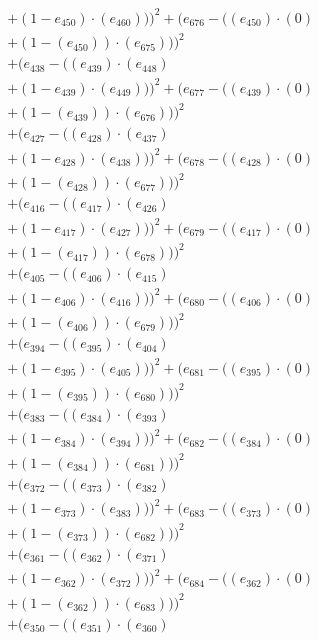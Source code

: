 \documentclass[10pt, a4paper]{article}
\begin{document}
\begin{small}
\begin{align*}
& + (1 - e_{450})  \cdot  (e_{460})))^{2} + (e_{676} - ((e_{450}) \cdot (0) \\
& + (1 - (e_{450})) \cdot (e_{675})))^{2} \\
& + (e_{438} - ((e_{439})  \cdot  (e_{448}) \\
& + (1 - e_{439})  \cdot  (e_{449})))^{2} + (e_{677} - ((e_{439}) \cdot (0) \\
& + (1 - (e_{439})) \cdot (e_{676})))^{2} \\
& + (e_{427} - ((e_{428})  \cdot  (e_{437}) \\
& + (1 - e_{428})  \cdot  (e_{438})))^{2} + (e_{678} - ((e_{428}) \cdot (0) \\
& + (1 - (e_{428})) \cdot (e_{677})))^{2} \\
& + (e_{416} - ((e_{417})  \cdot  (e_{426}) \\
& + (1 - e_{417})  \cdot  (e_{427})))^{2} + (e_{679} - ((e_{417}) \cdot (0) \\
& + (1 - (e_{417})) \cdot (e_{678})))^{2} \\
& + (e_{405} - ((e_{406})  \cdot  (e_{415}) \\
& + (1 - e_{406})  \cdot  (e_{416})))^{2} + (e_{680} - ((e_{406}) \cdot (0) \\
& + (1 - (e_{406})) \cdot (e_{679})))^{2} \\
& + (e_{394} - ((e_{395})  \cdot  (e_{404}) \\
& + (1 - e_{395})  \cdot  (e_{405})))^{2} + (e_{681} - ((e_{395}) \cdot (0) \\
& + (1 - (e_{395})) \cdot (e_{680})))^{2} \\
& + (e_{383} - ((e_{384})  \cdot  (e_{393}) \\
& + (1 - e_{384})  \cdot  (e_{394})))^{2} + (e_{682} - ((e_{384}) \cdot (0) \\
& + (1 - (e_{384})) \cdot (e_{681})))^{2} \\
& + (e_{372} - ((e_{373})  \cdot  (e_{382}) \\
& + (1 - e_{373})  \cdot  (e_{383})))^{2} + (e_{683} - ((e_{373}) \cdot (0) \\
& + (1 - (e_{373})) \cdot (e_{682})))^{2} \\
& + (e_{361} - ((e_{362})  \cdot  (e_{371}) \\
& + (1 - e_{362})  \cdot  (e_{372})))^{2} + (e_{684} - ((e_{362}) \cdot (0) \\
& + (1 - (e_{362})) \cdot (e_{683})))^{2} \\
& + (e_{350} - ((e_{351})  \cdot  (e_{360}) \\

\end{align*}
\end{small}
\end{document}
